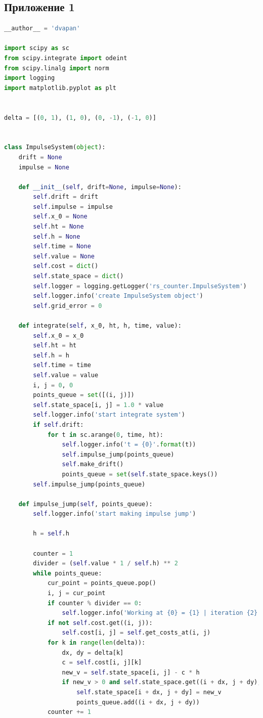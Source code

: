\documentclass[a4paper,12pt]{article}
\begin{document}
\normalsize
\subsection*{Приложение 1}
\label{appl_src}

\begin{lstlisting}[language=Python,
caption={Интерфейс Impulse System}]
__author__ = 'dvapan'

import scipy as sc
from scipy.integrate import odeint
from scipy.linalg import norm
import logging
import matplotlib.pyplot as plt


delta = [(0, 1), (1, 0), (0, -1), (-1, 0)]


class ImpulseSystem(object):
    drift = None
    impulse = None

    def __init__(self, drift=None, impulse=None):
        self.drift = drift
        self.impulse = impulse
        self.x_0 = None
        self.ht = None
        self.h = None
        self.time = None
        self.value = None
        self.cost = dict()
        self.state_space = dict()
        self.logger = logging.getLogger('rs_counter.ImpulseSystem')
        self.logger.info('create ImpulseSystem object')
        self.grid_error = 0

    def integrate(self, x_0, ht, h, time, value):
        self.x_0 = x_0
        self.ht = ht
        self.h = h
        self.time = time
        self.value = value
        i, j = 0, 0
        points_queue = set([(i, j)])
        self.state_space[i, j] = 1.0 * value
        self.logger.info('start integrate system')
        if self.drift:
            for t in sc.arange(0, time, ht):
                self.logger.info('t = {0}'.format(t))
                self.impulse_jump(points_queue)
                self.make_drift()
                points_queue = set(self.state_space.keys())
        self.impulse_jump(points_queue)

    def impulse_jump(self, points_queue):
        self.logger.info('start making impulse jump')

        h = self.h

        counter = 1
        divider = (self.value * 1 / self.h) ** 2
        while points_queue:
            cur_point = points_queue.pop()
            i, j = cur_point
            if counter % divider == 0:
                self.logger.info('Working at {0} = {1} | iteration {2}'.format((i, j), self.state_space[i, j], counter))
            if not self.cost.get((i, j)):
                self.cost[i, j] = self.get_costs_at(i, j)
            for k in range(len(delta)):
                dx, dy = delta[k]
                c = self.cost[i, j][k]
                new_v = self.state_space[i, j] - c * h
                if new_v > 0 and self.state_space.get((i + dx, j + dy), 0) < new_v:
                    self.state_space[i + dx, j + dy] = new_v
                    points_queue.add((i + dx, j + dy))
            counter += 1


\end{lstlisting}
\end{document}

